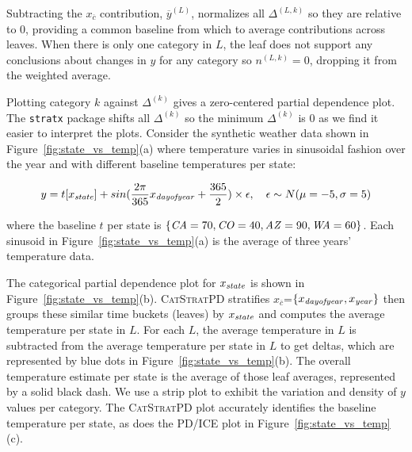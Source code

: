 \documentclass[12pt]{article}
\newcommand{\figref}[1]{Figure~\ref{#1}}
\newcommand{\cspd}{\fontfamily{cmr}\textsc{\small CatStratPD}}
\newcommand{\xnc}{$x_{\overline{c}}$}
\begin{document}
\noindent Subtracting the \xnc{} contribution, $\overline{y}^{(L)}$, normalizes all $\Delta^{(L,k)}$ so they are relative to 0, providing a common baseline from which to average contributions across leaves. When there is only one category in $L$, the leaf does not support any conclusions about changes in $y$ for any category so $n^{(L,k)}=0$, dropping it from the weighted average. 

Plotting category $k$ against $\Delta^{(k)}$ gives a zero-centered partial dependence plot. The {\tt stratx} package shifts all $\Delta^{(k)}$ so the minimum $\Delta^{(k)}$ is 0 as we find it easier to interpret the plots. Consider the synthetic weather data shown in \figref{fig:state_vs_temp}(a) where temperature varies in sinusoidal fashion over the year and with different baseline temperatures per state:

\begin{equation}\label{eq:weather}
y = t[x_{\it state}] + sin(\frac{2 \pi}{365} x_{\it dayofyear} + \frac{365}{2}) \times \epsilon, ~~~ \epsilon \sim N(\mu=-5,\sigma=5)
\end{equation}

\noindent where the baseline $t$ per state is $\{{\it CA}=70, {\it CO}=40, {\it AZ}=90, {\it WA}=60\}$. Each sinusoid in \figref{fig:state_vs_temp}(a) is the average of three years' temperature data.

The categorical partial dependence plot for $x_{\it state}$ is shown in \figref{fig:state_vs_temp}(b).
\cspd{} stratifies \xnc{}=$\{x_{\it dayofyear}, x_{\it year}\}$ then groups these similar time buckets (leaves) by $x_{\it state}$ and computes the average temperature per state in $L$. For each $L$, the average temperature in $L$ is subtracted from the average temperature per state in $L$ to get deltas, which are represented by blue dots in \figref{fig:state_vs_temp}(b). The overall temperature estimate per state is the average of those leaf averages, represented by a solid black dash. We use a strip plot to exhibit the variation and density of $y$ values per category. The \cspd{} plot accurately identifies the baseline temperature per state, as does the PD/ICE plot in \figref{fig:state_vs_temp}(c).
\end{document}
